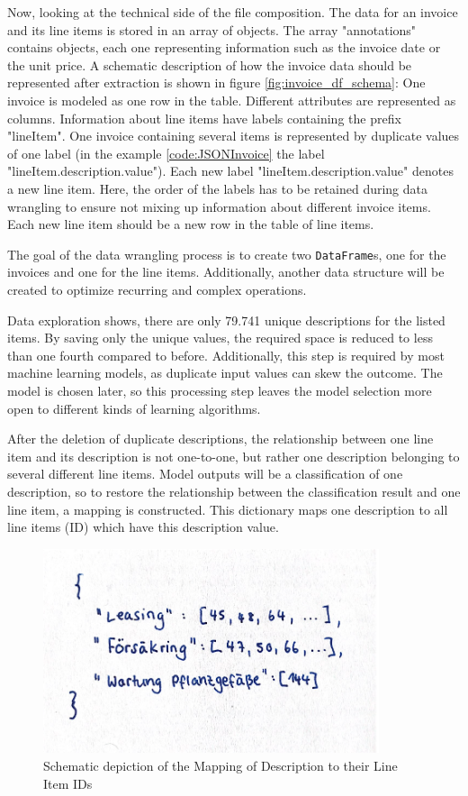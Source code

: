 	Now, looking at the technical side of the file composition.	The data for an invoice and its line items is stored in an array of objects. The array "annotations" contains objects, each one representing information such as the invoice date or the unit price. A schematic description of how the invoice data should be represented after extraction is shown in figure \ref{fig:invoice_df_schema}: One invoice is modeled as one row in the table. Different attributes are represented as columns.
	Information about line items have labels containing the prefix "lineItem". One invoice containing several items is represented by duplicate values of one label (in the example \ref{code:JSONInvoice} the label "lineItem.description.value"). Each new label "lineItem.description.value" denotes a new line item. Here, the order of the labels has to be retained during data wrangling to ensure not mixing up information about different invoice items. Each new line item should be a new row in the table of line items.
	
	The goal of the data wrangling process is to create two \lstinline|DataFrame|s, one for the invoices and one for the line items.
	Additionally, another data structure will be created to optimize recurring and complex operations.
	
	Data exploration shows, there are only 79.741 unique descriptions for the listed items. By saving only the unique values, the required space is reduced to less than one fourth compared to before. Additionally, this step is required by most machine learning models, as duplicate input values can skew the outcome. The model is chosen later, so this processing step leaves the model selection more open to different kinds of learning algorithms.
	
	After the deletion of duplicate descriptions, the relationship between one line item and its description is not one-to-one, but rather one description belonging to several different line items. Model outputs will be a classification of one description, so to restore the relationship between the classification result and one line item, a mapping is constructed.
	This dictionary maps one description to all line items (ID) which have this description value.
	\begin{figure}[ht]
		\centering
		\includegraphics[height=6cm]{Bilder/description_map.png}
		\caption{Schematic depiction of the Mapping of Description to their Line Item IDs}
		\label{fig:mapping}
	\end{figure}


